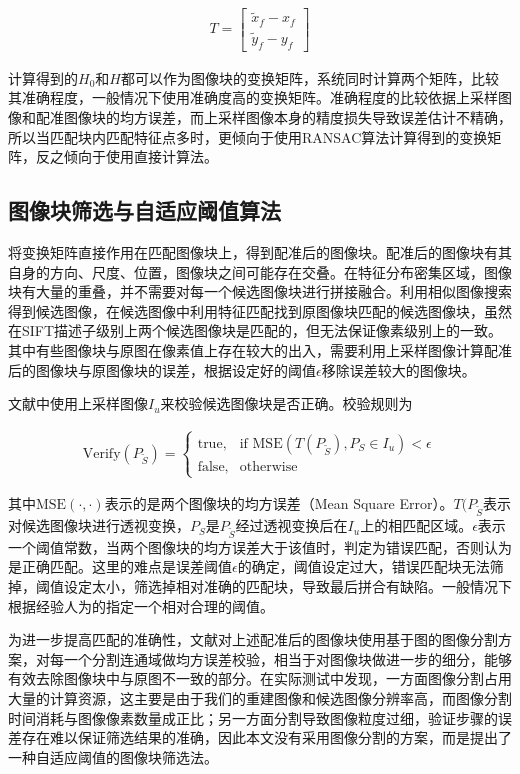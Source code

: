 \documentclass[UTF8]{csoarticle}
\begin{document}
\begin{align}
  T = 
  \begin{bmatrix}
    \tilde{x}_f - x_f \\
    \tilde{y}_f - y_f
  \end{bmatrix}
\end{align}

计算得到的\(H_0\)和\(H\)都可以作为图像块的变换矩阵，系统同时计算两个矩阵，比较其准确程度，一般情况下使用准确度高的变换矩阵。准确程度的比较依据上采样图像和配准图像块的均方误差，而上采样图像本身的精度损失导致误差估计不精确，所以当匹配块内匹配特征点多时，更倾向于使用RANSAC算法计算得到的变换矩阵，反之倾向于使用直接计算法。

\subsection{图像块筛选与自适应阈值算法}
将变换矩阵直接作用在匹配图像块上，得到配准后的图像块。配准后的图像块有其自身的方向、尺度、位置，图像块之间可能存在交叠。在特征分布密集区域，图像块有大量的重叠，并不需要对每一个候选图像块进行拼接融合。利用相似图像搜索得到候选图像，在候选图像中利用特征匹配找到原图像块匹配的候选图像块，虽然在SIFT描述子级别上两个候选图像块是匹配的，但无法保证像素级别上的一致。其中有些图像块与原图在像素值上存在较大的出入，需要利用上采样图像计算配准后的图像块与原图像块的误差，根据设定好的阈值\(\epsilon\)移除误差较大的图像块。

文献\cite{Dai:2012vn}中使用上采样图像\(I_u\)来校验候选图像块是否正确。校验规则为

\begin{align}
\label{eq:errorControl}
  \text{Verify}(P_{\tilde{S}}) = 
\begin{cases} 
\text{true}, & \mbox{if MSE} (T(P_{\tilde{S}}),P_S \in I_u) < \epsilon \\
\text{false}, & \mbox{otherwise}
\end{cases}
\end{align}

其中\(\text{MSE}(\cdot,\cdot)\)表示的是两个图像块的均方误差（Mean Square Error）。\(T(P_{\tilde{S}}\)表示对候选图像块进行透视变换，\(P_{S}\)是\(P_{\tilde{S}}\)经过透视变换后在\(I_u\)上的相匹配区域。\(\epsilon\)表示一个阈值常数，当两个图像块的均方误差大于该值时，判定为错误匹配，否则认为是正确匹配。这里的难点是误差阈值\(\epsilon\)的确定，阈值设定过大，错误匹配块无法筛掉，阈值设定太小，筛选掉相对准确的匹配块，导致最后拼合有缺陷。一般情况下根据经验人为的指定一个相对合理的阈值。

为进一步提高匹配的准确性，文献\cite{Dai:2012vn}对上述配准后的图像块使用基于图的图像分割方案，对每一个分割连通域做均方误差校验，相当于对图像块做进一步的细分，能够有效去除图像块中与原图不一致的部分。在实际测试中发现，一方面图像分割占用大量的计算资源，这主要是由于我们的重建图像和候选图像分辨率高，而图像分割时间消耗与图像像素数量成正比；另一方面分割导致图像粒度过细，验证步骤的误差存在难以保证筛选结果的准确，因此本文没有采用图像分割的方案，而是提出了一种自适应阈值的图像块筛选法。
\end{document}
